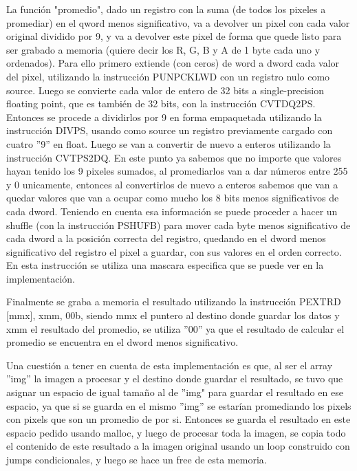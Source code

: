 \documentclass[a4paper]{article}
\begin{document}
La función "promedio", dado un registro con la suma (de todos los pixeles a promediar) en el qword menos significativo, va a devolver un pixel con cada valor original dividido por 9, y va a devolver este pixel de forma que quede listo para ser grabado a memoria (quiere decir los R, G, B y A de 1 byte cada uno y ordenados). Para ello primero extiende (con ceros) de word a dword cada valor del pixel, utilizando la instrucción PUNPCKLWD con un registro nulo como source. Luego se convierte cada valor de entero de 32 bits a single-precision floating point, que es también de 32 bits, con la instrucción CVTDQ2PS. Entonces se procede a dividirlos por 9 en forma empaquetada utilizando la instrucción DIVPS, usando como source un registro previamente cargado con cuatro ''9'' en float. Luego se van a convertir de nuevo a enteros utilizando la instrucción CVTPS2DQ. En este punto ya sabemos que no importe que valores hayan tenido los 9 pixeles sumados, al promediarlos van a dar números entre 255 y 0 unicamente, entonces al convertirlos de nuevo a enteros sabemos que van a quedar valores que van a ocupar como mucho los 8 bits menos significativos de cada dword. Teniendo en cuenta esa información se puede proceder a hacer un shuffle (con la instrucción PSHUFB) para mover cada byte menos significativo de cada dword a la posición correcta del registro, quedando en el dword menos significativo del registro el pixel a guardar, con sus valores en el orden correcto. En esta instrucción se utiliza una mascara especifica que se puede ver en la implementación.
\newline

Finalmente se graba a memoria el resultado utilizando la instrucción PEXTRD [mmx], xmm, 00b, siendo mmx el puntero al destino donde guardar los datos y xmm el resultado del promedio, se utiliza ''00'' ya que el resultado de calcular el promedio se encuentra en el dword menos significativo.
\newline

Una cuestión a tener en cuenta de esta implementación es que, al ser el array ''img'' la imagen a procesar y el destino donde guardar el resultado, se tuvo que asignar un espacio de igual tamaño al de ''img" para guardar el resultado en ese espacio, ya que si se guarda en el mismo ''img'' se estarían promediando los pixels con pixels que son un promedio de por si. Entonces se guarda el resultado en este espacio pedido usando malloc, y luego de procesar toda la imagen, se copia todo el contenido de este resultado a la imagen original usando un loop construido con jumps condicionales, y luego se hace un free de esta memoria.
\newline
\end{document}
